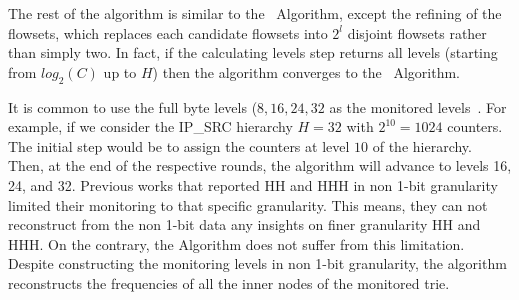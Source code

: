 The rest of the algorithm is similar to the ~\simpleAlgo Algorithm, except the refining of the flowsets, which replaces each candidate flowsets into $2^l$ disjoint flowsets rather than simply two. In fact, if the calculating levels step returns all levels (starting from $log_2(C)$ up to $H$) then the algorithm converges to the ~\simpleAlgo Algorithm.

It is common to use the full byte levels ($8, 16, 24,32$ as the monitored levels~\cite{MST, BenBasat2017}.  For example, if we consider the IP\_SRC hierarchy $H=32$ with $2^{10}=1024$ counters. The initial step would be to assign the counters at level $10$ of the hierarchy. Then, at the end of the respective rounds, the algorithm will advance to levels 16, 24, and 32.
Previous works that reported HH and HHH in non 1-bit granularity limited their monitoring to that specific granularity. This means, they can not reconstruct from the non 1-bit data any insights on finer granularity HH and HHH. On the contrary, the \multipleAlgo Algorithm does not suffer from this limitation. Despite constructing the monitoring levels in non 1-bit granularity, the algorithm reconstructs the frequencies of all the inner nodes of the monitored trie.


